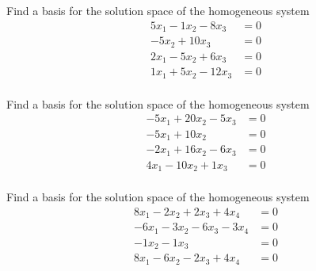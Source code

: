 \documentclass{article}
\begin{document}
\begin{exerciseStatement}
    Find a basis for the solution space of the homogeneous system
\begin{align*}
 5 x_ 1 -1 x_ 2 -8 x_ 3 &= 0  \\
  -5 x_ 2 + 10 x_ 3 &= 0  \\
  2 x_ 1 -5 x_ 2 + 6 x_ 3 &= 0  \\
  1 x_ 1 + 5 x_ 2 -12 x_ 3 &= 0  \\
 \end{align*}



  
\end{exerciseStatement}

\begin{exerciseStatement}
    Find a basis for the solution space of the homogeneous system
\begin{align*}
 -5 x_ 1 + 20 x_ 2 -5 x_ 3 &= 0  \\
  -5 x_ 1 + 10 x_ 2 &= 0  \\
  -2 x_ 1 + 16 x_ 2 -6 x_ 3 &= 0  \\
  4 x_ 1 -10 x_ 2 + 1 x_ 3 &= 0  \\
 \end{align*}



  
\end{exerciseStatement}

\begin{exerciseStatement}
    Find a basis for the solution space of the homogeneous system
\begin{align*}
 8 x_ 1 -2 x_ 2 + 2 x_ 3 + 4 x_ 4 &= 0  \\
  -6 x_ 1 -3 x_ 2 -6 x_ 3 -3 x_ 4 &= 0  \\
  -1 x_ 2 -1 x_ 3 &= 0  \\
  8 x_ 1 -6 x_ 2 -2 x_ 3 + 4 x_ 4 &= 0  \\
 \end{align*}



  
\end{exerciseStatement}
\end{document}
